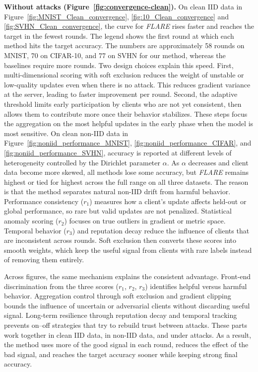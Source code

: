 \documentclass[lettersize,journal]{IEEEtran}
\begin{document}
{\textbf{Without attacks (Figure~\ref{fig:convergence-clean}).}
On clean IID data in Figure~\ref{fig:MNIST_Clean_convergence}, \ref{fig:10_Clean_convergence} and \ref{fig:SVHN_Clean_convergence}, the curve for \textit{FLARE} rises faster and reaches the target in the fewest rounds. The legend shows the first round at which each method hits the target accuracy. The numbers are approximately 58 rounds on MNIST, 70 on CIFAR-10, and 77 on SVHN for our method, whereas the baselines require more rounds. Two design choices explain this speed. First, multi-dimensional scoring with soft exclusion reduces the weight of unstable or low-quality updates even when there is no attack. This reduces gradient variance at the server, leading to faster improvement per round. Second, the adaptive threshold limits early participation by clients who are not yet consistent, then allows them to contribute more once their behavior stabilizes. These steps focus the aggregation on the most helpful updates in the early phase when the model is most sensitive. On clean non-IID data in Figure~\ref{fig:noniid_performance_MNIST}, \ref{fig:noniid_performance_CIFAR}, and \ref{fig:noniid_performance_SVHN}, accuracy is reported at different levels of heterogeneity controlled by the Dirichlet parameter $\alpha$. As $\alpha$ decreases and client data become more skewed, all methods lose some accuracy, but \textit{FLARE} remains highest or tied for highest across the full range on all three datasets. The reason is that the method separates natural non-IID drift from harmful behavior. Performance consistency ($r_1$) measures how a client’s update affects held-out or global performance, so rare but valid updates are not penalized. Statistical anomaly scoring ($r_2$) focuses on true outliers in gradient or metric space. Temporal behavior ($r_3$) and reputation decay reduce the influence of clients that are inconsistent across rounds. Soft exclusion then converts these scores into smooth weights, which keep the useful signal from clients with rare labels instead of removing them entirely.

Across figures, the same mechanism explains the consistent advantage. Front-end discrimination from the three scores ($r_1$, $r_2$, $r_3$) identifies helpful versus harmful behavior. Aggregation control through soft exclusion and gradient clipping bounds the influence of uncertain or adversarial clients without discarding useful signal. Long-term resilience through reputation decay and temporal tracking prevents on–off strategies that try to rebuild trust between attacks. These parts work together in clean IID data, in non-IID data, and under attacks. As a result, the method uses more of the good signal in each round, reduces the effect of the bad signal, and reaches the target accuracy sooner while keeping strong final accuracy.



}
\end{document}
